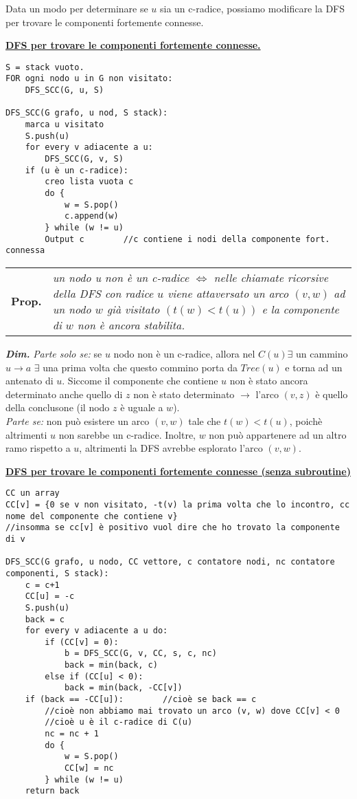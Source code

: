 \documentclass[a4paper,10pt]{article} %
\newcommand{\dimo}[1]{%
    \smallbreak \par \hfill\begin{minipage}{0.92\linewidth}{ \scriptsize {\textbf{\em{Dim.}}} {#1} }\end{minipage} \smallskip \par}
\newcommand{\malgorithm}[1]{%
    {\bigbreak \par \hspace*{4pt} \underline{\textbf {#1}}}}
\newcommand{\mprop}[1]{%
    {\smallbreak\par\begin{tabular}{ll} \textbf{Prop.} & \begin{minipage}[t]{0.8\columnwidth}\emph  {#1}\end{minipage}\tabularnewline \end{tabular}}\smallskip\par}
\begin{document}
Data un modo per determinare se $u$ sia un c-radice, possiamo modificare la DFS per trovare le componenti fortemente connesse.

\malgorithm{DFS per trovare le componenti fortemente connesse.}
\begin{lstlisting}
S = stack vuoto.
FOR ogni nodo u in G non visitato:
    DFS_SCC(G, u, S)

DFS_SCC(G grafo, u nod, S stack):
    marca u visitato
    S.push(u)
    for every v adiacente a u:
        DFS_SCC(G, v, S)
    if (u è un c-radice):
        creo lista vuota c
        do {
            w = S.pop()
            c.append(w)
        } while (w != u)
        Output c        //c contiene i nodi della componente fort. connessa
\end{lstlisting}

\mprop{un nodo u non è un c-radice $\Leftrightarrow$ nelle chiamate ricorsive della DFS con radice $u$ viene attaversato un arco $(v, w)$ ad un nodo $w$ già visitato $(t(w) < t(u))$ e la componente di $w$ non è ancora stabilita.}
\dimo{\emph{Parte solo se:} se $u$ nodo non è un c-radice, allora nel $C(u) \exists $ un cammino $u \rightarrow a$ $\exists$ una prima volta che questo commino porta da $Tree(u)$ e torna ad un antenato di $u$. Siccome il componente che contiene $u$ non è stato ancora determinato anche quello di $z$ non è stato determinato $\rightarrow$ l'arco $(v, z)$ è quello della conclusone (il nodo $z$ è uguale a $w$).\\
      \emph{Parte se:} non può esistere un arco $(v, w)$ tale che $t(w) < t(u)$, poichè altrimenti $u$ non sarebbe un c-radice. Inoltre, $w$ non può appartenere ad un altro ramo rispetto a $u$, altrimenti la DFS avrebbe esplorato l'arco $(v, w)$.
  }


\malgorithm{DFS per trovare le componenti fortemente connesse (senza subroutine)}
\begin{lstlisting}
CC un array
CC[v] = {0 se v non visitato, -t(v) la prima volta che lo incontro, cc nome del componente che contiene v}
//insomma se cc[v] è positivo vuol dire che ho trovato la componente di v

DFS_SCC(G grafo, u nodo, CC vettore, c contatore nodi, nc contatore componenti, S stack):
    c = c+1
    CC[u] = -c
    S.push(u)
    back = c
    for every v adiacente a u do:
        if (CC[v] = 0):
            b = DFS_SCC(G, v, CC, s, c, nc)
            back = min(back, c)
        else if (CC[u] < 0):
            back = min(back, -CC[v])
    if (back == -CC[u]):        //cioè se back == c
        //cioè non abbiamo mai trovato un arco (v, w) dove CC[v] < 0
        //cioè u è il c-radice di C(u)
        nc = nc + 1
        do {
            w = S.pop()
            CC[w] = nc
        } while (w != u)
    return back
\end{lstlisting}
\end{document}
